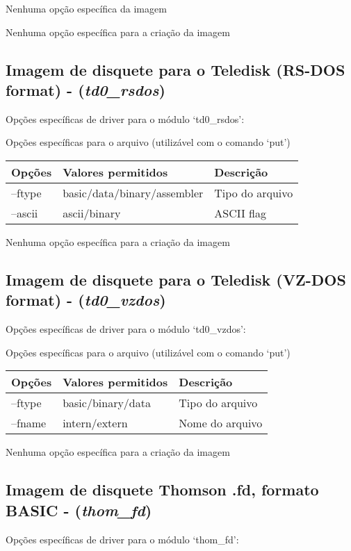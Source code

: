 \documentclass[letterpaper,10pt,brazil]{sphinxmanual}
\begin{document}
Nenhuma opção específica da imagem

Nenhuma opção específica para a criação da imagem


\subsection{Imagem de disquete para o Teledisk (RS-DOS format) - (\emph{td0\_rsdos})}
\label{tools/imgtool:imagem-de-disquete-para-o-teledisk-rs-dos-format-td0-rsdos}
Opções específicas de driver para o módulo `td0\_rsdos':

Opções específicas para o arquivo (utilizável com o comando `put')

\noindent\begin{tabulary}{\linewidth}{|L|L|L|}
\hline

Opções
&
Valores permitidos
&
Descrição
\\
\hline
--ftype
&
basic/data/binary/assembler
&
Tipo do arquivo
\\
\hline
--ascii
&
ascii/binary
&
ASCII flag
\\
\hline\end{tabulary}


Nenhuma opção específica para a criação da imagem


\subsection{Imagem de disquete para o Teledisk (VZ-DOS format) - (\emph{td0\_vzdos})}
\label{tools/imgtool:imagem-de-disquete-para-o-teledisk-vz-dos-format-td0-vzdos}
Opções específicas de driver para o módulo `td0\_vzdos':

Opções específicas para o arquivo (utilizável com o comando `put')

\noindent\begin{tabulary}{\linewidth}{|L|L|L|}
\hline

Opções
&
Valores permitidos
&
Descrição
\\
\hline
--ftype
&
basic/binary/data
&
Tipo do arquivo
\\
\hline
--fname
&
intern/extern
&
Nome do arquivo
\\
\hline\end{tabulary}


Nenhuma opção específica para a criação da imagem


\subsection{Imagem de disquete Thomson .fd, formato BASIC - (\emph{thom\_fd})}
\label{tools/imgtool:imagem-de-disquete-thomson-fd-formato-basic-thom-fd}
Opções específicas de driver para o módulo `thom\_fd':
\end{document}
